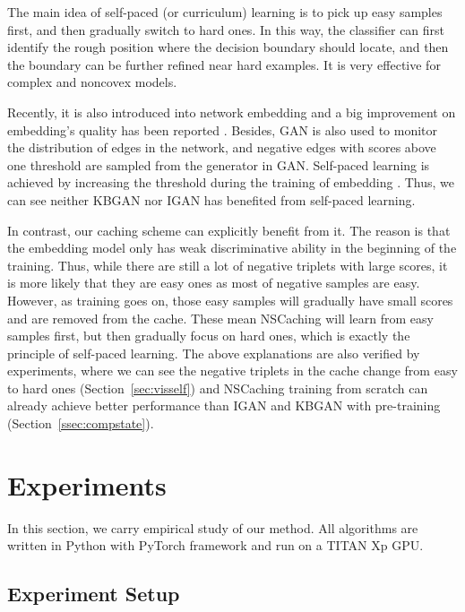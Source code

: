 \documentclass[conference]{IEEEtran}
\begin{document}
The main idea 
of self-paced (or curriculum) learning \cite{bengio2009curriculum,kumar2010self}
is to pick up easy samples first,
and then gradually switch to hard ones.
In this way,
the classifier can first identify the rough position where the decision boundary should locate,
and then the boundary can be further refined near hard examples.
It is very effective for complex and noncovex models.

Recently,
it is also introduced into network embedding 
and a big improvement on embedding's quality has been reported \cite{gao2018self}.
Besides,
GAN is also used to monitor the distribution of edges in the network,
and negative edges with scores above one threshold are sampled from the generator in GAN. 
Self-paced learning is achieved by increasing the threshold during the training of embedding \cite{gao2018self}.
Thus,
we can see neither KBGAN nor IGAN has benefited from self-paced learning.

In contrast,
our caching scheme can explicitly benefit from it.
{
The reason is that 
the embedding model only has weak discriminative ability in the beginning of the training. 
Thus,
while there are still a lot of negative triplets with large scores,
it is more likely that they are easy ones as most of negative samples are easy.
However, 
as training goes on,
those easy samples will gradually have small scores and are removed from the cache.
These mean NSCaching will learn from easy samples first,
but then gradually focus on hard ones,
which is exactly the principle of self-paced learning.
}
The above explanations are also verified by
experiments,
where we can see 
the negative triplets in the cache change from easy to hard ones (Section~\ref{sec:visself})
and NSCaching training from scratch can already achieve better performance
than IGAN and KBGAN with pre-training (Section~\ref{ssec:compstate}).




\section{Experiments}
\label{sec:exp}

In this section,
we carry empirical study of our method. 
All algorithms are written in Python with PyTorch framework \cite{paszke2017automatic} and run on a TITAN Xp GPU.  


\subsection{Experiment Setup}
\label{secc:exp-setup}
\end{document}
